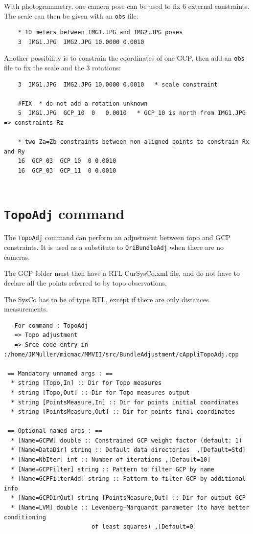 With photogrammetry, one camera pose can be used to fix 6 external constraints. The scale can then be given with an {\tt obs} file:
\begin{verbatim}
    * 10 meters between IMG1.JPG and IMG2.JPG poses
    3  IMG1.JPG  IMG2.JPG 10.0000 0.0010   
\end{verbatim}

Another possibility is to constrain the coordinates of one GCP, then add an {\tt obs} file to fix the scale and the 3 rotations:
\begin{verbatim}
    3  IMG1.JPG  IMG2.JPG 10.0000 0.0010   * scale constraint

    #FIX  * do not add a rotation unknown
    5  IMG1.JPG  GCP_10  0   0.0010   * GCP_10 is north from IMG1.JPG => constraints Rz

    * two Za=Zb constraints between non-aligned points to constrain Rx and Ry
    16  GCP_03  GCP_10  0 0.0010
    16  GCP_03  GCP_11  0 0.0010
    
\end{verbatim}


\section{\texttt{TopoAdj} command}
\label{sec:TopoAdj}

The {\tt TopoAdj} command can perform an adjustment between topo and GCP constraints.
It is used as a substitute to {\tt OriBundleAdj} when there are no cameras.

The GCP folder must then have a RTL CurSysCo.xml file, and do not have to declare all the points
referred to by topo observations, 

The SysCo has to be of type RTL, except if there are only distances measurements.

\begin{verbatim}
   For command : TopoAdj 
   => Topo adjustment
   => Srce code entry in :/home/JMMuller/micmac/MMVII/src/BundleAdjustment/cAppliTopoAdj.cpp

 == Mandatory unnamed args : ==
  * string [Topo,In] :: Dir for Topo measures
  * string [Topo,Out] :: Dir for Topo measures output
  * string [PointsMeasure,In] :: Dir for points initial coordinates
  * string [PointsMeasure,Out] :: Dir for points final coordinates

 == Optional named args : ==
  * [Name=GCPW] double :: Constrained GCP weight factor (default: 1)
  * [Name=DataDir] string :: Default data directories  ,[Default=Std]
  * [Name=NbIter] int :: Number of iterations ,[Default=10]
  * [Name=GCPFilter] string :: Pattern to filter GCP by name
  * [Name=GCPFilterAdd] string :: Pattern to filter GCP by additional info
  * [Name=GCPDirOut] string [PointsMeasure,Out] :: Dir for output GCP
  * [Name=LVM] double :: Levenberg–Marquardt parameter (to have better conditioning
                         of least squares) ,[Default=0]

\end{verbatim}



